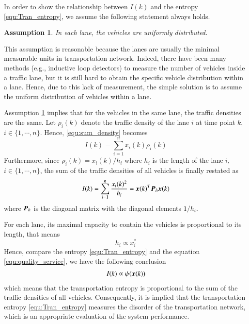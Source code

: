 \documentclass[preprint,authoryear,12pt]{elsarticle}
\renewcommand{\vec}[1]{\mbox{\boldmath$#1$}}
\newcommand{\mat}[1]{\mbox{\boldmath$#1$}}
\newtheorem{ass}{Assumption}
\begin{document}
In order to show the relationship between $I(k)$ and the entropy \eqref{equ:Tran_entropy}, we assume the following statement always holds.
\begin{ass}\label{ass:distribution}
In each lane, the vehicles are uniformly distributed.
\end{ass}
This assumption is reasonable because the lanes are usually the minimal measurable units in transportation network. Indeed, there have been many methods (e.g., inductive loop detectors) to measure the number of vehicles inside a traffic lane, but it is still hard to obtain the specific vehicle distribution within a lane. Hence, due to this lack of measurement, the simple solution is to assume the uniform distribution of vehicles within a lane.

Assumption \ref{ass:distribution} implies that for the vehicles in the same lane, the traffic densities are the same. Let $\rho_i(k)$ denote the traffic density of the lane $i$ at time point $k$, $i\in \{1,\cdots,n\}$. Hence, \eqref{equ:sum_density} becomes
$$I(k)=\sum_{i=1}^{n} x_i(k)\rho_i(k)$$
Furthermore, since $\rho_i(k)=x_i(k)/h_i$ where $h_i$ is the length of the lane $i$, $i\in \{1,\cdots,n\}$, the sum of the traffic densities of all vehicles is finally restated as
\begin{equation}
\label{equ:quality_service}
I(k)=\sum_{i=1}^{n}
\frac{x_i(k)^2}{h_i}=\vec{x}(k)^T\mat{P}_h\vec{x}(k)
\end{equation}
where $\mat{P}_h$ is the diagonal matrix with the diagonal elements $1/h_i$.

For each lane, its maximal capacity to contain the vehicles is proportional to its length, that means
\begin{equation}\label{equ:proportional_l_x}
h_i \varpropto x_i^*
\end{equation}
Hence, compare the entropy \eqref{equ:Tran_entropy} and the equation \eqref{equ:quality_service}, we have the following conclusion
\begin{equation}\label{equ:conclusion_quality}
I(k) \varpropto \psi(\vec{x}(k))
\end{equation}
which means that the transportation entropy is proportional to the sum of the traffic densities of all vehicles. Consequently, it is implied that the transportation entropy \eqref{equ:Tran_entropy} measures the disorder of the transportation network, which is an appropriate evaluation of the system performance.
\end{document}
